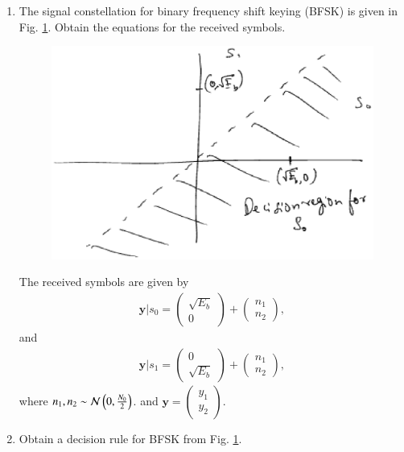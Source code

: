 \renewcommand{\theequation}{\theenumi}
\begin{enumerate}[label=\arabic*.,ref=\thesubsection.\theenumi]
\item
The signal constellation for binary frequency shift keying (BFSK) is given in Fig. \ref{fig:bfsk_const}.
Obtain the equations for the received symbols.

\begin{figure}[!h]
\centering
\includegraphics[width=\columnwidth]{./modulation/manual/figs/bfsk_const.eps}
\caption{}
\label{fig:bfsk_const}
\end{figure}
\solution
The received symbols are given by
\begin{align}
\mathbf{y}|s_0 = 
\begin{pmatrix*}
\sqrt{E_b} \\
0
\end{pmatrix*}
+
\begin{pmatrix*}
 n_{1}\\
n_{2}
\end{pmatrix*},
\end{align}
and 
\begin{align}
\mathbf{y}|s_1 = 
\begin{pmatrix*}
0\\
\sqrt{E_b} 
\end{pmatrix*}
+
\begin{pmatrix*}
n_{1}\\
 n_{2}
\end{pmatrix*},
\end{align}
where $n_1,n_2 \sim \mathcal{N}\left(0,\frac{N_0}{2}\right)$. and
$
\mathbf{y} = 
\begin{pmatrix*}
y_{1}\\
 y_{2}
\end{pmatrix*}
$.
\item
Obtain a decision rule for BFSK from Fig. \ref{fig:bfsk_const}.


\end{enumerate}
